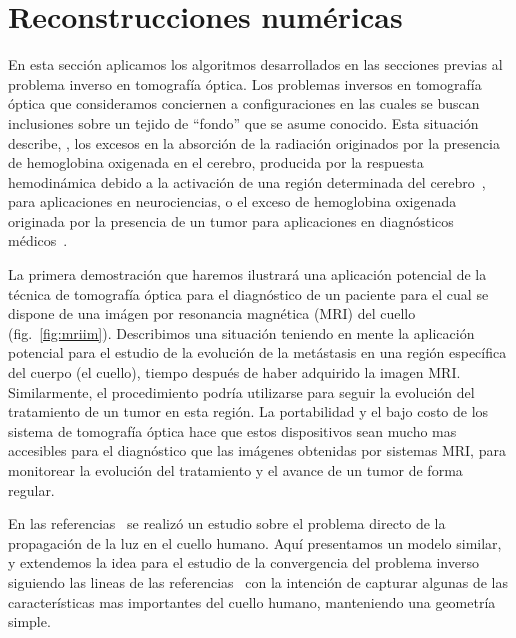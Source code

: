 \section{Reconstrucciones numéricas}
\label{sec:inverseres}
En esta sección aplicamos los algoritmos desarrollados 
en las secciones previas al problema inverso en tomografía óptica. 
Los problemas inversos en tomografía óptica que consideramos 
conciernen a configuraciones en las cuales se buscan inclusiones 
sobre un tejido de ``fondo'' que se asume conocido. Esta situación describe, 
\eg, los excesos en la absorción de la radiación originados 
por la presencia de hemoglobina oxigenada en el cerebro, 
producida por la respuesta hemodinámica debido a la activación 
de una región determinada del cerebro~\cite{Boas2001,bluestone2001,Arridge1999,Hernandez2020}, 
para aplicaciones en neurociencias, 
o el exceso de hemoglobina oxigenada originada por la presencia de un tumor 
para aplicaciones en diagnósticos médicos~\cite{Althobaiti2017,Guven2003,Zhu2005,Zhu2010,Fujii2016b}.

La primera demostración que haremos ilustrará una aplicación potencial 
de la técnica de tomografía óptica para el diagnóstico 
de un paciente para el cual se dispone de una imágen por resonancia magnética (MRI)
del cuello (fig.~\ref{fig:mriim}). Describimos una situación teniendo 
en mente la aplicación potencial para el estudio de la evolución de la metástasis 
en una región específica del cuerpo (el cuello), tiempo después 
de haber adquirido la imagen MRI. Similarmente, el procedimiento 
podría utilizarse para seguir la evolución del tratamiento de un tumor en esta región. 
La portabilidad y el bajo costo de los sistema de tomografía óptica 
hace que estos dispositivos sean mucho mas accesibles para el diagnóstico 
que las imágenes obtenidas por sistemas MRI, para monitorear 
la evolución del tratamiento y el avance de un tumor de forma regular. 

En las referencias~\cite{Fujii2016b,Fujii2016} se realizó un estudio sobre el problema directo de la propagación de la luz en el cuello humano. Aquí presentamos un modelo similar,
 y extendemos la idea para el estudio 
de la convergencia del problema inverso siguiendo las lineas de las referencias~\cite{Fujii2016b,Fujii2016} con la intención de capturar 
algunas de las características mas importantes del cuello humano, 
manteniendo una geometría simple. 


